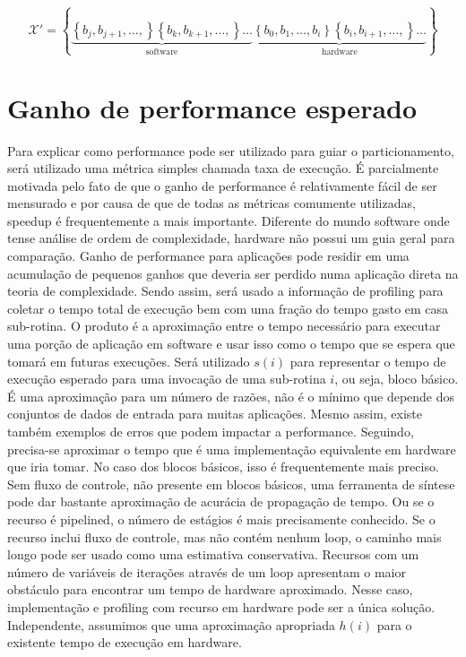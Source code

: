 $$ 
\mathcal{X}'   = \left \{  
\underbrace{\left \{ b_j, b_{j+1}, \dots, \right \}\left \{ b_k, b_{k+1}, \dots, \right \}\dots}_{\text{software}}
\underbrace{\left \{ b_0, b_1, \dots, b_i \right \} \left \{ b_i, b_{i+1}, \dots, \right \}\dots}_{\text{hardware}}
\right \}
$$



\section{Ganho de performance esperado}
Para explicar como performance pode ser utilizado para guiar o particionamento, será utilizado uma métrica simples chamada taxa de execução. É parcialmente motivada pelo fato de que o ganho de performance é relativamente fácil de ser mensurado e por causa de que de todas as métricas comumente utilizadas, speedup é frequentemente a mais importante. Diferente do mundo software onde tense análise de ordem de complexidade, hardware não possui um guia geral para comparação. Ganho de performance para aplicações pode residir em uma acumulação de pequenos ganhos que deveria ser perdido numa aplicação direta na teoria de complexidade. 
Sendo assim, será usado a informação de profiling para coletar o tempo total de execução bem com uma fração do tempo gasto em casa sub-rotina. O produto é a aproximação entre o tempo necessário para executar uma porção de aplicação em software e usar isso como o tempo que se espera que tomará em futuras execuções. Será utilizado $ s(i) $ para representar o tempo de execução esperado para uma invocação de uma sub-rotina $ i $, ou seja, bloco básico. É uma aproximação para um número de razões, não é o mínimo que depende dos conjuntos de dados de entrada para muitas aplicações. Mesmo assim, existe também exemplos de erros que podem impactar a performance.
Seguindo, precisa-se aproximar o tempo que é uma implementação equivalente em hardware que iria tomar. No caso dos blocos básicos, isso é frequentemente mais preciso. Sem fluxo de controle, não presente em blocos básicos, uma ferramenta de síntese pode dar bastante aproximação de acurácia de propagação de tempo. Ou se o recurso é pipelined, o número de estágios é mais precisamente conhecido. Se o recurso inclui fluxo de controle, mas não contém nenhum loop, o caminho mais longo pode ser usado como uma estimativa conservativa. Recursos com um número de variáveis de iterações através de um loop apresentam o maior obstáculo para encontrar um tempo de hardware aproximado. Nesse caso, implementação e profiling com recurso em hardware pode ser a única solução. Independente, assumimos que uma aproximação apropriada $ h(i) $ para o existente tempo de execução em hardware.
